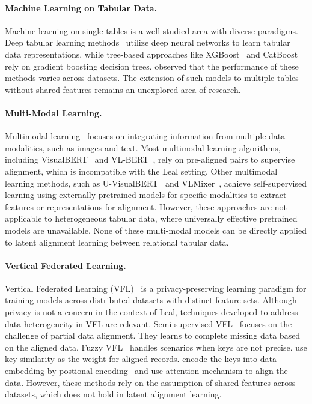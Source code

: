 \paragraph{Machine Learning on Tabular Data.} Machine learning on single tables is a well-studied area with diverse paradigms. Deep tabular learning methods~\cite{gorishniy2024tabm, gorishniy2021revisiting, ye2024ptarl} utilize deep neural networks to learn tabular data representations, while tree-based approaches like XGBoost~\cite{chen2016xgboost} and CatBoost~\cite{prokhorenkova2018catboost} rely on gradient boosting decision trees. \citet{mcelfresh2024neural} observed that the performance of these methods varies across datasets. The extension of such models to multiple tables without shared features remains an unexplored area of research.

\paragraph{Multi-Modal Learning.} Multimodal learning~\cite{xu2023multimodal} focuses on integrating information from multiple data modalities, such as images and text. Most multimodal learning algorithms, including VisualBERT~\cite{li2019visualbert} and VL-BERT~\cite{su2019vl}, rely on pre-aligned pairs to supervise alignment, which is incompatible with the Leal setting. Other multimodal learning methods, such as U-VisualBERT~\cite{li2020unsupervised} and VLMixer~\cite{wang2022vlmixer}, achieve self-supervised learning using externally pretrained models for specific modalities to extract features or representations for alignment. However, these approaches are not applicable to heterogeneous tabular data, where universally effective pretrained models are unavailable. None of these multi-modal models can be directly applied to latent alignment learning between relational tabular data.

\paragraph{Vertical Federated Learning.} Vertical Federated Learning (VFL)~\cite{liu2024vertical} is a privacy-preserving learning paradigm for training models across distributed datasets with distinct feature sets. Although privacy is not a concern in the context of Leal, techniques developed to address data heterogeneity in VFL are relevant. Semi-supervised VFL~\cite{kang2022fedcvt, sun2023communication} focuses on the challenge of partial data alignment. They learns to complete missing data based on the aligned data. Fuzzy VFL~\cite{wu2022coupled, wu2024federated} handles scenarios when keys are not precise. \citet{wu2022coupled} use key similarity as the weight for aligned records. \citet{wu2024federated} encode the keys into data embedding by postional encoding~\cite{li2021learnable} and use attention mechanism to align the data. However, these methods rely on the assumption of shared features across datasets, which does not hold in latent alignment learning.
